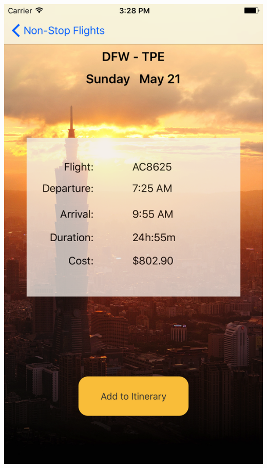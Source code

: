 \documentclass{beamer}
\begin{document}
\begin{frame}
\begin{columns}
\begin{column}{0.3\textwidth}
        \begin{center} 
            \includegraphics[scale=0.08]{flightsDetail}
        \end{center}
    \end{column}
\end{columns}
\end{frame}
\end{document}
